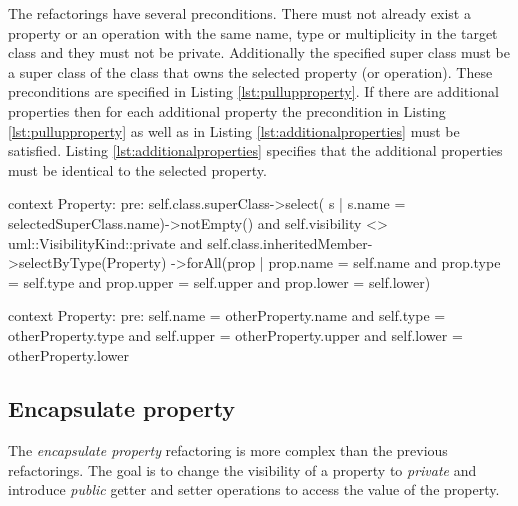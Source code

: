 \documentclass{llncs}
\begin{document}
The refactorings have several preconditions. There must not already exist a property or an operation with the same name, type or 
multiplicity in the target class and they must not be private. Additionally the specified super class must be a super class of the
class that owns the selected property (or operation). These preconditions are specified in Listing \ref{lst:pullupproperty}. If there are 
additional properties then for each additional property the precondition in Listing \ref{lst:pullupproperty} as well as in Listing 
\ref{lst:additionalproperties} must be satisfied. Listing \ref{lst:additionalproperties} specifies that the additional properties must be
identical to the selected property.

\begin{lstsingle}[language=OCL,caption=OCL for \textit{pull up property},label=lst:pullupproperty]
context Property:
pre: self.class.superClass->select(
         s | s.name = selectedSuperClass.name)->notEmpty()
     and self.visibility <> uml::VisibilityKind::private
     and self.class.inheritedMember->selectByType(Property)
     ->forAll(prop | prop.name = self.name
              and prop.type = self.type
              and prop.upper = self.upper
              and prop.lower = self.lower)
\end{lstsingle}

\begin{lstsingle}[language=OCL, caption={OCL for additional properties}, label=lst:additionalproperties]
context Property:
pre: self.name = otherProperty.name
     and self.type = otherProperty.type
     and self.upper = otherProperty.upper
     and self.lower = otherProperty.lower
\end{lstsingle}

\subsection{Encapsulate property}
\label{sec:encapsulate}
The \textit{encapsulate property} refactoring is more complex than the previous refactorings. The goal is to change the visibility of a 
property to \textit{private} and introduce \textit{public} getter and setter operations to access the value of the property. 
\end{document}
